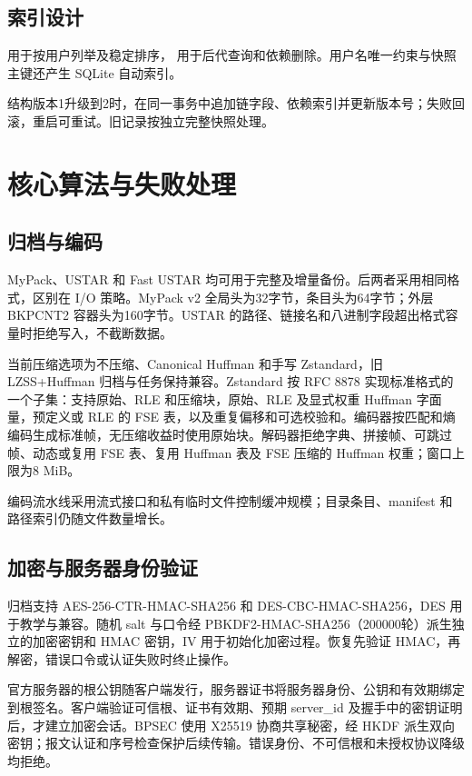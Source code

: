 \subsection{索引设计}
 用于按用户列举及稳定排序， 用于后代查询和依赖删除。用户名唯一约束与快照主键还产生 SQLite 自动索引。

结构版本1升级到2时，在同一事务中追加链字段、依赖索引并更新版本号；失败回滚，重启可重试。旧记录按独立完整快照处理。


\section{核心算法与失败处理}
\enlargethispage{3\baselineskip}
\subsection{归档与编码}
MyPack、USTAR 和 Fast USTAR 均可用于完整及增量备份。后两者采用相同格式，区别在 I/O 策略。MyPack v2 全局头为32字节，条目头为64字节；外层 BKPCNT2 容器头为160字节。USTAR 的路径、链接名和八进制字段超出格式容量时拒绝写入，不截断数据。

当前压缩选项为不压缩、Canonical Huffman 和手写 Zstandard，旧 LZSS+Huffman 归档与任务保持兼容。Zstandard 按 RFC 8878 实现标准格式的一个子集：支持原始、RLE 和压缩块，原始、RLE 及显式权重 Huffman 字面量，预定义或 RLE 的 FSE 表，以及重复偏移和可选校验和。编码器按匹配和熵编码生成标准帧，无压缩收益时使用原始块。解码器拒绝字典、拼接帧、可跳过帧、动态或复用 FSE 表、复用 Huffman 表及 FSE 压缩的 Huffman 权重；窗口上限为8 MiB。

编码流水线采用流式接口和私有临时文件控制缓冲规模；目录条目、manifest 和路径索引仍随文件数量增长。

\subsection{加密与服务器身份验证}
归档支持 AES-256-CTR-HMAC-SHA256 和 DES-CBC-HMAC-SHA256，DES 用于教学与兼容。随机 salt 与口令经 PBKDF2-HMAC-SHA256（200000轮）派生独立的加密密钥和 HMAC 密钥，IV 用于初始化加密过程。恢复先验证 HMAC，再解密，错误口令或认证失败时终止操作。

官方服务器的根公钥随客户端发行，服务器证书将服务器身份、公钥和有效期绑定到根签名。客户端验证可信根、证书有效期、预期 server\_id 及握手中的密钥证明后，才建立加密会话。BPSEC 使用 X25519 协商共享秘密，经 HKDF 派生双向密钥；报文认证和序号检查保护后续传输。错误身份、不可信根和未授权协议降级均拒绝。

